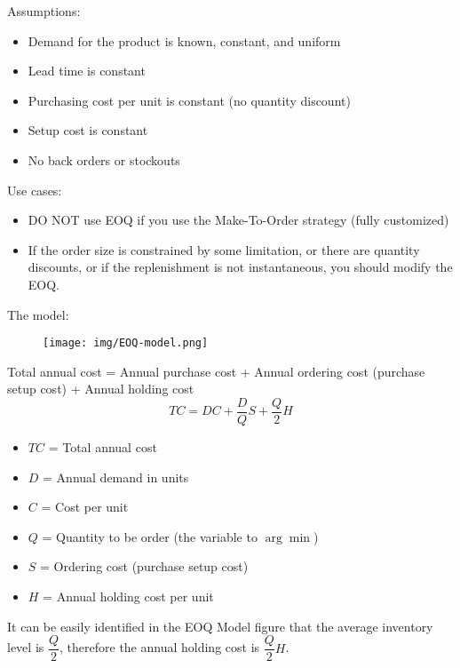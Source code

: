 \documentclass{article}
\begin{document}
Assumptions:
\begin{itemize}
	\item Demand for the product is known, constant, and uniform
	\item Lead time is constant
	\item Purchasing cost per unit is constant (no quantity discount)
	\item Setup cost is constant
	\item No back orders or stockouts
\end{itemize}

Use cases:
\begin{itemize}
	\item DO NOT use EOQ if you use the Make-To-Order strategy (fully customized)
	\item If the order size is constrained by some limitation,
	      or there are quantity discounts,
	      or if the replenishment is not instantaneous,
	      you should modify the EOQ.
\end{itemize}

The model:
\begin{figure}[H]
	\centering
	\texttt{[image: img/EOQ-model.png]}
\end{figure}

Total annual cost = Annual purchase cost + Annual ordering cost (purchase setup cost)
+ Annual holding cost
\[ TC = DC + \dfrac{D}{Q}S + \dfrac{Q}{2}H \]

\begin{itemize}
	\item $TC$ = Total annual cost
	\item $D$ = Annual demand in units
	\item $C$ = Cost per unit
	\item $Q$ = Quantity to be order (the variable to $\arg \min$)
	\item $S$ = Ordering cost (purchase setup cost)
	\item $H$ = Annual holding cost per unit
\end{itemize}

It can be easily identified in the EOQ Model figure that the average inventory level is
$\dfrac{Q}{2}$, therefore the annual holding cost is $\dfrac{Q}{2}H$.
\end{document}
